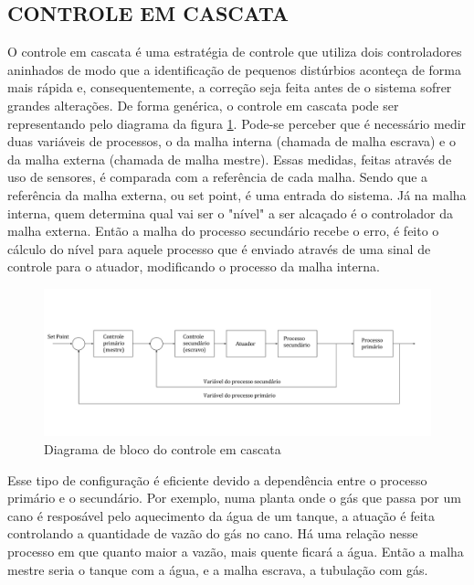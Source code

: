 \documentclass[a4paper,12pt]{article}
\begin{document}
\subsection{CONTROLE EM CASCATA}
\hspace{4ex}O controle em cascata é uma estratégia de controle que utiliza dois controladores aninhados de modo que a identificação de pequenos distúrbios aconteça de forma mais rápida e, consequentemente, a correção seja feita antes de o sistema sofrer grandes alterações. De forma genérica, o controle em cascata pode ser representando pelo diagrama da figura \ref{cascata}. Pode-se perceber que é necessário medir duas variáveis de processos, o da malha interna (chamada de malha escrava) e o da malha externa (chamada de malha mestre). Essas medidas, feitas através de uso de sensores, é comparada com a referência de cada malha. Sendo que a referência da malha externa, ou set point, é uma entrada do sistema. Já na malha interna, quem determina qual vai ser o "nível" a ser alcaçado é o controlador da malha externa. Então a malha do processo secundário recebe o erro, é feito o cálculo do nível para aquele processo que é enviado através de uma sinal de controle para o atuador, modificando o processo da malha interna.     

\begin{figure}[h]
\centering
\includegraphics[width=17cm]{ImagensLab4/controle-em-cascata.png}
\caption{Diagrama de bloco do controle em cascata}
\label{cascata}
\end{figure}

Esse tipo de configuração é eficiente devido a dependência entre o processo primário e o secundário. Por exemplo, numa planta onde o gás que passa por um cano é resposável pelo aquecimento da água de um tanque, a atuação é feita controlando a quantidade de vazão do gás no cano. Há uma relação nesse processo em que quanto maior a vazão, mais quente ficará a água. Então a malha mestre seria o tanque com a água, e a malha escrava, a tubulação com gás. 
\end{document}

